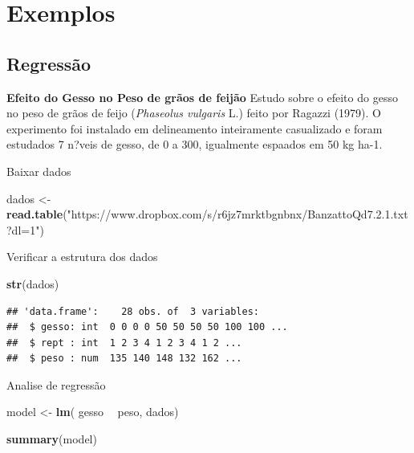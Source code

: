 \documentclass[
]{book}
\newenvironment{Shaded}{\begin{snugshade}}{\end{snugshade}}
\newcommand{\KeywordTok}[1]{\textcolor[rgb]{0.13,0.29,0.53}{\textbf{#1}}}
\newcommand{\NormalTok}[1]{#1}
\newcommand{\OperatorTok}[1]{\textcolor[rgb]{0.81,0.36,0.00}{\textbf{#1}}}
\newcommand{\StringTok}[1]{\textcolor[rgb]{0.31,0.60,0.02}{#1}}
\begin{document}
\hypertarget{exemplos}{%
\section{Exemplos}\label{exemplos}}

\hypertarget{regressuxe3o}{%
\subsection{Regressão}\label{regressuxe3o}}

\textbf{Efeito do Gesso no Peso de grãos de feijão}
Estudo sobre o efeito do gesso no peso de grãos de feijo (\emph{Phaseolus vulgaris} L.) feito por Ragazzi (1979). O experimento foi instalado em delineamento inteiramente casualizado e foram estudados 7 n?veis de gesso, de 0 a 300, igualmente espaados em 50 kg ha-1.

Baixar dados

\begin{Shaded}
\begin{Highlighting}[]
\NormalTok{dados <-}\StringTok{ }\KeywordTok{read.table}\NormalTok{(}\StringTok{"https://www.dropbox.com/s/r6jz7mrktbgnbnx/BanzattoQd7.2.1.txt?dl=1"}\NormalTok{)}
\end{Highlighting}
\end{Shaded}

Verificar a estrutura dos dados

\begin{Shaded}
\begin{Highlighting}[]
\KeywordTok{str}\NormalTok{(dados)}
\end{Highlighting}
\end{Shaded}

\begin{verbatim}
## 'data.frame':    28 obs. of  3 variables:
##  $ gesso: int  0 0 0 0 50 50 50 50 100 100 ...
##  $ rept : int  1 2 3 4 1 2 3 4 1 2 ...
##  $ peso : num  135 140 148 132 162 ...
\end{verbatim}

Analise de regressão

\begin{Shaded}
\begin{Highlighting}[]
\NormalTok{model <-}\StringTok{ }\KeywordTok{lm}\NormalTok{(  gesso }\OperatorTok{~}\StringTok{ }\NormalTok{peso, dados)}

\KeywordTok{summary}\NormalTok{(model)}
\end{Highlighting}
\end{Shaded}
\end{document}
